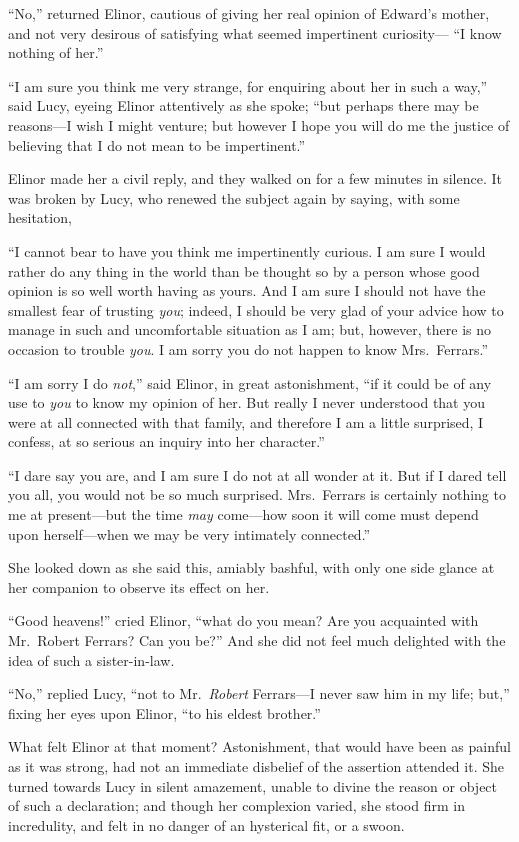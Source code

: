 ``No,'' returned Elinor, cautious of giving her real
opinion of Edward's mother, and not very desirous
of satisfying what seemed impertinent curiosity---%
``I know nothing of her.''

``I am sure you think me very strange, for enquiring
about her in such a way,'' said Lucy, eyeing Elinor attentively
as she spoke; ``but perhaps there may be reasons---I wish
I might venture; but however I hope you will do me the justice
of believing that I do not mean to be impertinent.''

Elinor made her a civil reply, and they walked on
for a few minutes in silence.  It was broken by Lucy,
who renewed the subject again by saying, with some
hesitation,

``I cannot bear to have you think me impertinently curious.
I am sure I would rather do any thing in the world than be
thought so by a person whose good opinion is so well worth
having as yours.  And I am sure I should not have the smallest
fear of trusting \emph{you}; indeed, I should be very glad of your
advice how to manage in such and uncomfortable situation
as I am; but, however, there is no occasion to trouble \emph{you}.
I am sorry you do not happen to know Mrs.\ Ferrars.''

``I am sorry I do \emph{not},'' said Elinor, in great astonishment,
``if it could be of any use to \emph{you} to know my opinion of her.
But really I never understood that you were at all connected
with that family, and therefore I am a little surprised,
I confess, at so serious an inquiry into her character.''

``I dare say you are, and I am sure I do not at all
wonder at it.  But if I dared tell you all, you would not be
so much surprised.  Mrs.\ Ferrars is certainly nothing to me
at present---but the time \emph{may} come---how soon it will come
must depend upon herself---when we may be very intimately
connected.''

She looked down as she said this, amiably bashful,
with only one side glance at her companion to observe its
effect on her.

``Good heavens!'' cried Elinor, ``what do you mean?
Are you acquainted with Mr.\ Robert Ferrars?  Can you be?''
And she did not feel much delighted with the idea of such
a sister-in-law.

``No,'' replied Lucy, ``not to Mr.\ \emph{Robert} Ferrars---I
never saw him in my life; but,'' fixing her eyes upon Elinor,
``to his eldest brother.''

What felt Elinor at that moment? Astonishment,
that would have been as painful as it was strong, had not
an immediate disbelief of the assertion attended it.
She turned towards Lucy in silent amazement, unable to divine
the reason or object of such a declaration; and though
her complexion varied, she stood firm in incredulity,
and felt in no danger of an hysterical fit, or a swoon.

